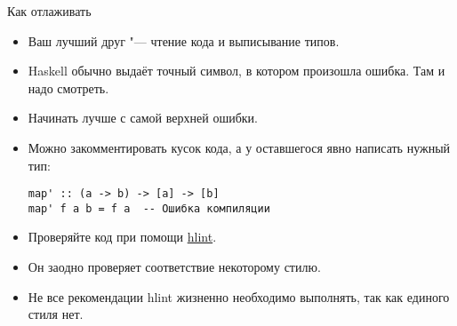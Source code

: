 \begin{frame}[fragile]{Как отлаживать}
	\begin{itemize}
		\item Ваш лучший друг "--- чтение кода и выписывание типов.
		\item Haskell обычно выдаёт точный символ, в котором произошла ошибка. Там и надо смотреть.
		\item Начинать лучше с самой верхней ошибки.
		\item Можно закомментировать кусок кода, а у оставшегося явно написать нужный тип:
\begin{verbatim}
map' :: (a -> b) -> [a] -> [b]
map' f a b = f a  -- Ошибка компиляции
\end{verbatim}
		\item Проверяйте код при помощи \href{https://hackage.haskell.org/package/hlint}{hlint}.
		\item Он заодно проверяет соответствие некоторому стилю.
		\item Не все рекомендации hlint жизненно необходимо выполнять, так как единого стиля нет.
	\end{itemize}
\end{frame}
